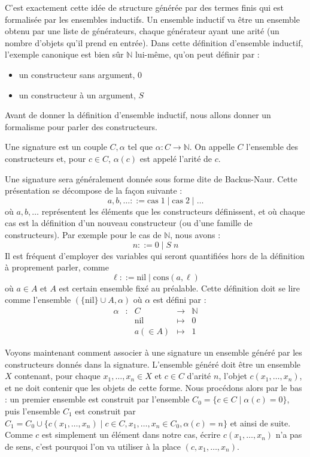 C'est exactement cette idée de structure générée par des termes finis qui est
formalisée par les ensembles inductifs. Un ensemble inductif va être un ensemble
obtenu par une liste de générateurs, chaque générateur ayant une arité (un
nombre d'objets qu'il prend en entrée). Dans cette définition d'ensemble
inductif, l'exemple canonique est bien sûr $\mathbb N$ lui-même, qu'on peut
définir par :
\begin{itemize}
\item un constructeur sans argument, $0$
\item un constructeur à un argument, $S$
\end{itemize}

Avant de donner la définition d'ensemble inductif, nous allons donner un
formalisme pour parler des constructeurs.

\begin{definition}[Signature]
  Une signature est un couple $C,\alpha$ tel que $\alpha : C \to \mathbb N$.
  On appelle $C$ l'ensemble des constructeurs et, pour $c \in C$, $\alpha(c)$
  est appelé l'arité de $c$.
\end{definition}

Une signature sera généralement donnée sous forme dite de Backus-Naur. Cette
présentation se décompose de la façon suivante :
$$a,b,\ldots ::= \mathrm{cas}\;1 \mid \mathrm{cas}\;2 \mid \ldots$$
où $a,b,\ldots$ représentent les éléments que les constructeurs définissent,
et où chaque cas est la définition d'un nouveau constructeur (ou d'une famille
de constructeurs). Par exemple pour le cas de $\mathbb N$, nous avons :
$$n ::= 0 \mid S\;n$$
Il est fréquent d'employer des variables qui seront quantifiées hors de la
définition à proprement parler, comme
$$\ell ::= \mathrm{nil} \mid \mathrm{cons}(a,\ell)$$
où $a \in A$ et $A$ est certain ensemble fixé au préalable. Cette définition
doit se lire comme l'ensemble $(\{\mathrm{nil}\} \cup A,\alpha)$ où $\alpha$
est défini par :
$$
\begin{array}{rcccl}
  \alpha &:& C & \longrightarrow & \mathbb N\\
  & & \mathrm{nil} & \longmapsto & 0 \\
  & & a (\in A) & \longmapsto & 1
\end{array}
$$

Voyons maintenant comment associer à une signature un ensemble généré par les
constructeurs donnés dans la signature. L'ensemble généré doit être un ensemble
$X$ contenant, pour chaque $x_1,\ldots,x_n \in X$ et $c \in C$ d'arité $n$,
l'objet $c(x_1,\ldots,x_n)$, et ne doit contenir que les objets de cette forme.
Nous procédons alors par le bas : un premier ensemble est construit par
l'ensemble $C_0 = \{ c \in C \mid \alpha(c) = 0\}$, puis l'ensemble $C_1$ est
construit par $C_1 = C_0 \cup \{ c(x_1,\ldots,x_n) \mid c \in C, x_1,\ldots,
x_n \in C_0, \alpha(c) = n\}$ et ainsi de suite. Comme $c$ est simplement un
élément dans notre cas, écrire $c(x_1,\ldots,x_n)$ n'a pas de sens, c'est
pourquoi l'on va utiliser à la place $(c,x_1,\ldots,x_n)$.

